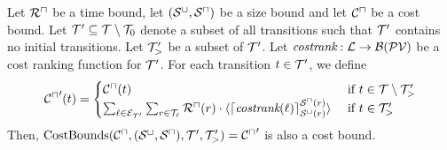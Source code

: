 \begin{theorem}
  Let ${\mathcal{R}^\sqcap}$ be a time bound, let ${({\mathcal{S}^\sqcup}, {\mathcal{S}^\sqcap})}$ be a size bound and let ${\mathcal{C}^\sqcap}$ be a cost bound.
  Let $\mathcal{T}' \subseteq \mathcal{T} \setminus \mathcal{T}_0$ denote a subset of all transitions such that $\mathcal{T}'$ contains no initial transitions.
  Let $\mathcal{T}'_>$ be a subset of $\mathcal{T}'$.
  Let $\emph{costrank}: \mathcal{L} \rightarrow \mathcal{B}(\mathcal{PV})$ be a cost ranking function for $\mathcal{T}'$.
  For each transition $t \in \mathcal{T}'$, we define
  \[ {\mathcal{C}^\sqcap}'(t) = 
  \begin{cases}
    {\mathcal{C}^\sqcap}(t) & \text{ if } t \in \mathcal{T} \setminus \mathcal{T}'_> \\
    \sum_{\ell \in \mathcal{E}_{\mathcal{T}'}} \sum_{r \in \mathcal{T}_\ell} {\mathcal{R}^\sqcap}(r) \cdot \langle\lceil \emph{costrank}(\ell) \rceil^{{\mathcal{S}^\sqcap}(r)}_{{\mathcal{S}^\sqcup}(r)}\rangle & \text{ if } t \in \mathcal{T}'_>
  \end{cases}
  \]
  Then, $\text{CostBounds}({\mathcal{C}^\sqcap}, {({\mathcal{S}^\sqcup}, {\mathcal{S}^\sqcap})}, \mathcal{T}', \mathcal{T}'_>) = {\mathcal{C}^\sqcap}'$ is also a cost bound.
\end{theorem}
